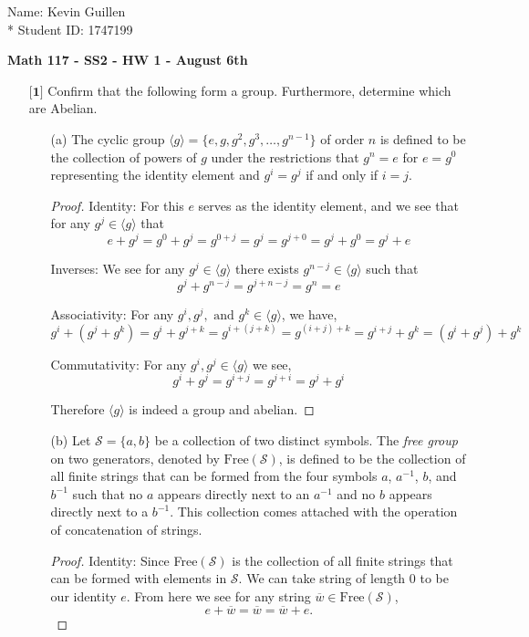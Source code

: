 \documentclass[12pt]{article}
\begin{document}
\begin{flushright}
    Name: Kevin Guillen \\*
    Student ID: 1747199
\end{flushright}
\begin{center}
    {\bf Math 117 - SS2 - HW 1 - August 6th}
\end{center}

\begin{itemize}

    \item[$\textbf{[1]}$]%
    Confirm that the following form a group. Furthermore, determine which are Abelian. 
    \begin{itemize}
    
    \vspace{.3cm}
    \item[(a)]
    The cyclic group $\langle g \rangle = \{ e,g,g^2,g^3,\dots,g^{n-1} \}$ of order $n$ is defined to be the collection of powers of $g$ under the restrictions that $g^n = e$ for $e = g^0$ representing the identity element and $g^i = g^j$ if and only if $i = j$. 
    \begin{proof}
        Identity: For this $e$ serves as the identity element, and we see that for any $g^j \in \langle g \rangle $ that \[e + g^j = g^0 + g^j = g^{0+j} = g^j = g^{j+0} = g^j + g^0 = g^j + e\]
    
        Inverses: We see for any $g^j \in \langle g \rangle$ there exists $g^{n-j}\in \langle g \rangle $ such that \[g^j + g^{n-j} = g^{j + n - j} = g^n = e\]
    
        Associativity: For any $g^i, g^j, \text{ and }g^k \in \langle g \rangle $, we have,
        \[g^i + (g^j + g^k) = g^i + g^{j + k} = g^{i + (j+k)} = g^{(i+j) +k} = g^{i+j} + g^k = (g^i + g^j) +g^k\]
    
        Commutativity: For any $g^i, g^j \in \langle g \rangle $ we see,
        \[g^i + g^j = g^{i+j} = g^{j+i} = g^j + g^i\]
    
        Therefore $\langle g \rangle $ is indeed a group and abelian. 
    \end{proof}
    
    \vspace{.3cm}
    \item[(b)]
    Let $\mathcal{S} = \{a,b\}$ be a collection of two distinct symbols. The \textit{free group} on two generators, denoted by $\text{Free}(\mathcal{S})$, is defined to be the collection of all finite strings that can be formed from the four symbols $a$, $a^{-1}$, $b$, and $b^{-1}$ such that no $a$ appears directly next to an $a^{-1}$ and no $b$ appears directly next to a $b^{-1}$. This collection comes attached with the operation of concatenation of strings. 
    \begin{proof}
        Identity: Since Free$(\mathcal{S})$ is the collection of all finite strings that can be formed with elements in $\mathcal{S}$. We can take string of length 0 to be our identity $e$. From here we see for any string $\overline{w}\in \text{Free}(\mathcal{S})$, \[e + \overline{w} = \overline{w} = \overline{w} + e.\]
    

\end{proof}
\end{itemize}
\end{itemize}
\end{document}
